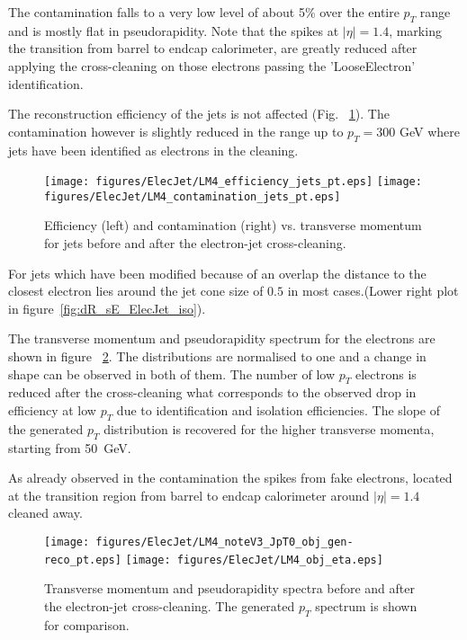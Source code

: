 \documentclass{cmspaper}
\begin{document}
The contamination falls to a very low level of about 5\% over the entire $p_T$
range and is mostly flat in pseudorapidity. Note that the spikes at
$|\eta|=1.4$, marking the transition from barrel to endcap calorimeter, are
greatly reduced after applying the cross-cleaning on those electrons passing the
'LooseElectron' identification.

The reconstruction efficiency of the jets is not affected (Fig.
~\ref{fig:effCont_Jets_ElecJet}). The contamination however is slightly reduced
in the range up to $p_T=300$ GeV where jets have been identified as electrons in
the cleaning.
\begin{figure}[hb]
\begin{center}
    \texttt{[image: figures/ElecJet/LM4\_efficiency\_jets\_pt.eps]}
    \texttt{[image: figures/ElecJet/LM4\_contamination\_jets\_pt.eps]}
    \caption{Efficiency (left) and contamination (right) vs. transverse momentum
    for jets before and after the electron-jet cross-cleaning.}
\label{fig:effCont_Jets_ElecJet}
\end{center}
\end{figure}

For jets which have been modified because of an overlap the distance to the
closest electron lies around the jet cone size of $0.5$ in most cases.(Lower
right plot in figure~\ref{fig:dR_sE_ElecJet_iso}).

The transverse momentum and pseudorapidity spectrum for the electrons are shown
in figure ~\ref{fig:objSpectra_ElecJet}. The distributions are normalised to one
and a change in shape can be observed in both of them. The number of low $p_T$
electrons is reduced after the cross-cleaning what corresponds to the observed
drop in efficiency at low $p_T$ due to identification and isolation
efficiencies. The slope of the generated $p_T$ distribution is recovered for
the higher transverse momenta, starting from 50\ GeV.

As already observed in the contamination the spikes from fake
electrons, located at the transition region from barrel to endcap calorimeter
around $|\eta|=1.4$ cleaned away.

\begin{figure}[hb]
\begin{center}
    \texttt{[image: figures/ElecJet/LM4\_noteV3\_JpT0\_obj\_gen-reco\_pt.eps]}
    \texttt{[image: figures/ElecJet/LM4\_obj\_eta.eps]}
    \caption{Transverse momentum and pseudorapidity spectra before
    and after the electron-jet cross-cleaning. The generated $p_T$ spectrum is
    shown for comparison.}
\label{fig:objSpectra_ElecJet}
\end{center}
\end{figure}
\end{document}
